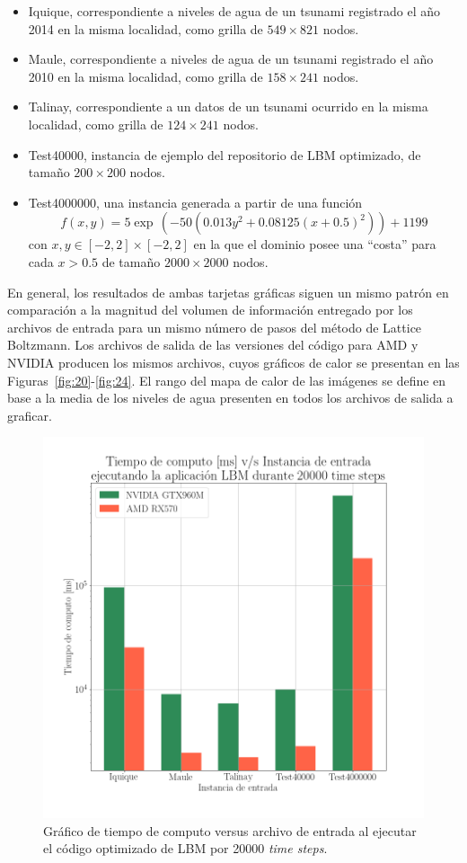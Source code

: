 \begin{itemize}
    \item Iquique, correspondiente a niveles de agua de un tsunami registrado el año 2014 en la misma localidad, como grilla de \(549\times821\) nodos.
    \item Maule, correspondiente a niveles de agua de un tsunami registrado el año 2010 en la misma localidad, como grilla de \(158\times241\) nodos.
    \item Talinay, correspondiente a un datos de un tsunami ocurrido en la misma localidad, como grilla de \(124\times241\) nodos.
    \item Test40000, instancia de ejemplo del repositorio de LBM optimizado, de tamaño \(200\times200\) nodos.
    \item Test4000000, una instancia generada a partir de una función 
    \begin{equation*}
        f(x,y) = 5\exp\,\left(-50(0.013y^2 + 0.08125(x+0.5)^2)\right) + 1199
    \end{equation*}
    con $x,y \in [-2,2]\times[-2,2]$ en la que el dominio posee una ``costa'' para cada $x > 0.5$ de tamaño \(2000\times2000\) nodos.
\end{itemize}

En general, los resultados de ambas tarjetas gráficas siguen un mismo patrón en comparación a la magnitud del volumen de información entregado por los archivos de entrada para un mismo número de pasos del método de Lattice Boltzmann.
Los archivos de salida de las versiones del código para AMD y NVIDIA producen los mismos archivos, cuyos gráficos de calor se presentan en las 
Figuras~\ref{fig:20}-\ref{fig:24}.
El rango del mapa de calor de las imágenes se define en base a la media de los niveles de agua presenten en todos los archivos de salida a graficar.

\begin{figure}[H]
  \centering
    \includegraphics[width=0.8\linewidth]{Figures/plot4.png}
  \caption{Gráfico de tiempo de computo versus archivo de entrada al ejecutar el código optimizado de LBM por 20000 \textit{time steps}.}
  \label{fig:18}
\end{figure}

